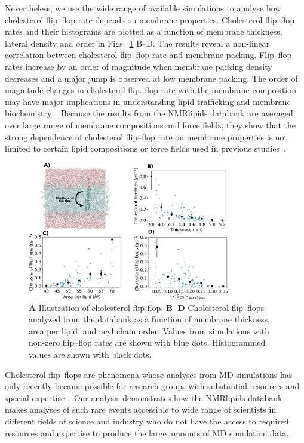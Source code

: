 \documentclass[fleqn,10pt]{wlscirep}
\begin{document}
Nevertheless, we use the wide range of available simulations to analyse how cholesterol flip--flop rate depends on membrane properties. Cholesterol flip--flop rates and their histograms are plotted as a function of membrane thickness, lateral density and order in Figs.~\ref{fig:flip-flops} B--D. The results reveal a non-linear correlation between cholesterol flip--flop rate and membrane packing. Flip--flop rates increase by an order of magnitude when membrane packing density decreases and a major jump is observed at low membrane packing. The order of magnitude changes in cholesterol flip.-flop rate with the membrane composition may have major implications in understanding lipid trafficking and membrane biochemistry~\cite{gu19,baral20}. Because the results from the NMRlipids databank are averaged over large range of membrane compositions and force fields, they show that the strong dependence of cholesterol flip--flop rate on membrane properties is not limited to certain lipid compositions or force fields used in previous studies~\cite{gu19,javanainen19,baral20}.

\begin{figure}[htb]
    \centering
    \includegraphics[width=88mm]{Figures/CholFlipFlops.pdf}
    \caption{\textbf{A} Illustration of cholesterol flip-flop.  
      \textbf{B--D} Cholesterol flip--flops analyzed from the databank as a function of membrane thickness, area per lipid, and acyl chain order. Values from simulations with non-zero flip--flop rates are shown with blue dots. Histogrammed values are shown with black dots.
    }
    \label{fig:flip-flops}
\end{figure}

Cholesterol flip--flops are phenomena whose analyses from MD simulations has only recently became possible for research groups with substantial resources and special expertise~\cite{gu19,javanainen19,baral20}. Our analysis demonstrates how the NMRlipids databank makes analyses of such rare events accessible to wide range of scientists in different fields of science and industry who do not have the access to required resources and expertise to produce the large amounts of MD simulation data. 
\end{document}
